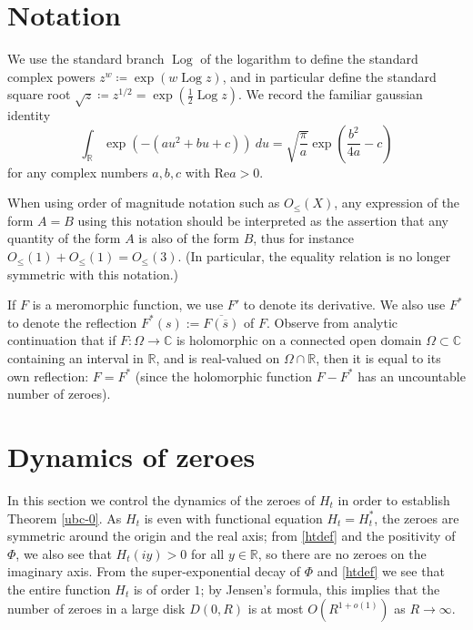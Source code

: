 \documentclass[a4paper,11pt,twoside]{amsart}
\newcommand\R{\mathbb{R}}
\newcommand\C{\mathbb{C}}
\newcommand\Log{{\operatorname{Log}}}
\begin{document}
\section{Notation}

We use the standard branch $\Log$ of the logarithm to define the standard complex powers $z^w \coloneqq \exp( w \Log z)$, and in particular define the standard square root $\sqrt{z} \coloneqq z^{1/2} = \exp( \frac{1}{2} \Log z)$.  We record the familiar gaussian identity
\begin{equation}\label{gaussian}
 \int_\R \exp\left(-(au^2+bu+c)\right)\ du = \sqrt{\frac{\pi}{a}} \exp\left( \frac{b^2}{4a} - c\right)
\end{equation}
for any complex numbers $a,b,c$ with $\mathrm{Re} a > 0$.

When using order of magnitude notation such as $O_{\leq}(X)$, any expression of the form $A=B$ using this notation should be interpreted as the assertion that any quantity of the form $A$ is also of the form $B$, thus for instance $O_{\leq}(1) + O_{\leq}(1) = O_{\leq}(3)$.  (In particular, the equality relation is no longer symmetric with this notation.)

If $F$ is a meromorphic function, we use $F'$ to denote its derivative.  We also use $F^*$ to denote the reflection $F^*(s) := \overline{F(\overline{s})}$ of $F$.  Observe from analytic continuation that if $F:\Omega \to \C$ is holomorphic on a connected open domain $\Omega \subset \C$ containing an interval in $\R$, and is real-valued on $\Omega \cap \R$, then it is equal to its own reflection: $F = F^*$ (since the holomorphic function $F - F^*$ has an uncountable number of zeroes).


\section{Dynamics of zeroes}\label{dynamics-sec}

In this section we control the dynamics of the zeroes of $H_t$ in order to establish Theorem \ref{ubc-0}.  As $H_t$ is even with functional equation $H_t = H_t^*$, the zeroes are symmetric around the origin and the real axis; from \eqref{htdef} and the positivity of $\Phi$, we also see that $H_t(iy) > 0$ for all $y \in \R$, so there are no zeroes on the imaginary axis.  From the super-exponential decay of $\Phi$ and \eqref{htdef} we see that the entire function $H_t$ is of order $1$; by Jensen's formula, this implies that the number of zeroes in a large disk $D(0,R)$ is at most $O( R^{1+o(1)})$ as $R \to \infty$.
\end{document}
